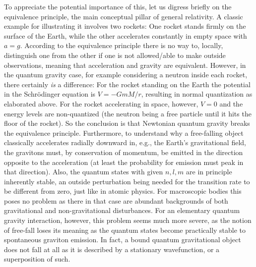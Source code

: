 	To appreciate the potential importance of this, let us digress briefly on the equivalence principle, the main conceptual pillar of general relativity. A classic example for illustrating it	involves two rockets: One rocket stands firmly on the surface of the Earth, while the other accelerates constantly in empty space	with $a = g$. According to the equivalence principle there is no 	way to, locally, distinguish one from the other if one is not allowed/able to make outside observations, meaning that acceleration and gravity are equivalent. However, in the quantum	gravity case, for example considering a neutron inside each rocket, there certainly \textit{is} a difference: For the rocket standing on the Earth the potential in the Schr\"{o}dinger equation is $V = -GmM/r$, resulting in normal quantization as	elaborated above. For the rocket accelerating in space, however, $V = 0$ and the energy levels are non-quantized (the neutron being a free particle until it hits the floor of the rocket). So the conclusion is that Newtonian quantum gravity breaks the equivalence principle. Furthermore, to understand why a	free-falling object classically accelerates radially downward in, e.g., the Earth's gravitational field, the gravitons must, by conservation of momentum, be emitted in the direction opposite to	the acceleration (at least the probability for emission must peak	in that direction). Also, the quantum states with given $n,l,m$ are in principle inherently stable, an outside perturbation being needed for the transition rate to be different from zero, just	like in atomic physics. For macroscopic bodies this poses no problem as there in that case are abundant backgrounds of both	gravitational and non-gravitational disturbances. For an elementary quantum gravity interaction, however, this problem seems much more severe, as the notion of free-fall loses its meaning as the quantum states become practically stable to spontaneous graviton emission. In fact, a bound quantum gravitational object does not fall at all as it is described by a stationary wavefunction, or a superposition of such.
	

